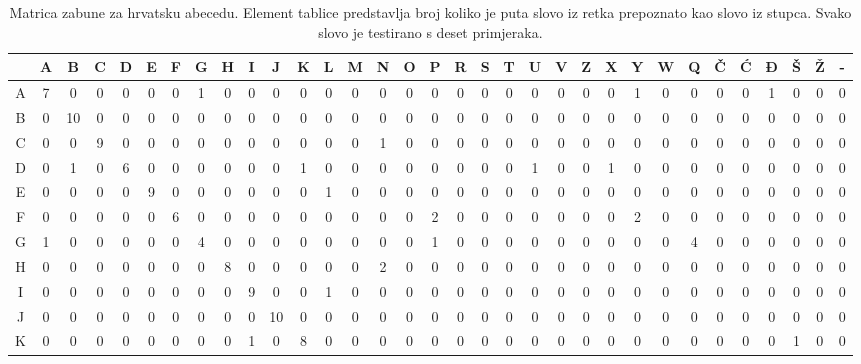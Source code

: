 \begin{table}[]
\setlength{\tabcolsep}{2pt}
\centering
\caption{Matrica zabune za hrvatsku abecedu. Element tablice predstavlja broj koliko je puta slovo iz retka prepoznato kao slovo iz stupca. Svako slovo je testirano s deset primjeraka.}
\label{confusion_matrix_cro}
\scalebox{0.9} {
\begin{tabular}{c|c|c|c|c|c|c|c|c|c|c|c|c|c|c|c|c|c|c|c|c|c|c|c|c|c|c|c|c|c|c|c|c}
\cline{2-33}
  & A & B  & C & D & E & F & G & H & I & J  & K & L & M & N & O & P  & R & S & T  & U & V  & Z & X & Y  & W & Q & Č & Ć  & Đ  & Š & Ž & -  \\ \hline
A & 7 & 0  & 0 & 0 & 0 & 0 & 1 & 0 & 0 & 0  & 0 & 0 & 0 & 0 & 0 & 0  & 0 & 0 & 0  & 0 & 0  & 0 & 0 & 1  & 0 & 0 & 0 & 0  & 1  & 0 & 0 & 0  \\ \hline
B & 0 & 10 & 0 & 0 & 0 & 0 & 0 & 0 & 0 & 0  & 0 & 0 & 0 & 0 & 0 & 0  & 0 & 0 & 0  & 0 & 0  & 0 & 0 & 0  & 0 & 0 & 0 & 0  & 0  & 0 & 0 & 0  \\ \hline
C & 0 & 0  & 9 & 0 & 0 & 0 & 0 & 0 & 0 & 0  & 0 & 0 & 0 & 1 & 0 & 0  & 0 & 0 & 0  & 0 & 0  & 0 & 0 & 0  & 0 & 0 & 0 & 0  & 0  & 0 & 0 & 0  \\ \hline
D & 0 & 1  & 0 & 6 & 0 & 0 & 0 & 0 & 0 & 0  & 1 & 0 & 0 & 0 & 0 & 0  & 0 & 0 & 0  & 1 & 0  & 0 & 1 & 0  & 0 & 0 & 0 & 0  & 0  & 0 & 0 & 0  \\ \hline
E & 0 & 0  & 0 & 0 & 9 & 0 & 0 & 0 & 0 & 0  & 0 & 1 & 0 & 0 & 0 & 0  & 0 & 0 & 0  & 0 & 0  & 0 & 0 & 0  & 0 & 0 & 0 & 0  & 0  & 0 & 0 & 0  \\ \hline
F & 0 & 0  & 0 & 0 & 0 & 6 & 0 & 0 & 0 & 0  & 0 & 0 & 0 & 0 & 0 & 2  & 0 & 0 & 0  & 0 & 0  & 0 & 0 & 2  & 0 & 0 & 0 & 0  & 0  & 0 & 0 & 0  \\ \hline
G & 1 & 0  & 0 & 0 & 0 & 0 & 4 & 0 & 0 & 0  & 0 & 0 & 0 & 0 & 0 & 1  & 0 & 0 & 0  & 0 & 0  & 0 & 0 & 0  & 0 & 4 & 0 & 0  & 0  & 0 & 0 & 0  \\ \hline
H & 0 & 0  & 0 & 0 & 0 & 0 & 0 & 8 & 0 & 0  & 0 & 0 & 0 & 2 & 0 & 0  & 0 & 0 & 0  & 0 & 0  & 0 & 0 & 0  & 0 & 0 & 0 & 0  & 0  & 0 & 0 & 0  \\ \hline
I & 0 & 0  & 0 & 0 & 0 & 0 & 0 & 0 & 9 & 0  & 0 & 1 & 0 & 0 & 0 & 0  & 0 & 0 & 0  & 0 & 0  & 0 & 0 & 0  & 0 & 0 & 0 & 0  & 0  & 0 & 0 & 0  \\ \hline
J & 0 & 0  & 0 & 0 & 0 & 0 & 0 & 0 & 0 & 10 & 0 & 0 & 0 & 0 & 0 & 0  & 0 & 0 & 0  & 0 & 0  & 0 & 0 & 0  & 0 & 0 & 0 & 0  & 0  & 0 & 0 & 0  \\ \hline
K & 0 & 0  & 0 & 0 & 0 & 0 & 0 & 0 & 1 & 0  & 8 & 0 & 0 & 0 & 0 & 0  & 0 & 0 & 0  & 0 & 0  & 0 & 0 & 0  & 0 & 0 & 0 & 0  & 0  & 1 & 0 & 0  \\ \hline

\end{tabular}}
\end{table}
